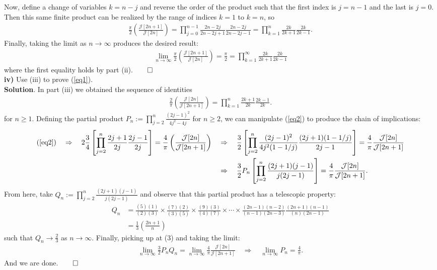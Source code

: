 \documentclass[10pt]{article}
\newcommand{\1}[1]{\mathbbm{1}_{#1}}
\newcommand{\mc}[1]{\mathcal{#1}}
\begin{document}
    Now, define a change of variables $k=n-j$ and reverse the order of the product such that the first index is $j=n-1$ and the last is $j=0$. Then this same finite product can be realized by
    the range of indices $k=1$ to $k=n$, so
    \begin{align*}
        \frac{\pi}{2}\left(\frac{\mc{J}[2n+1]}{\mc{J}[2n]}\right)=\prod_{j=0}^{n-1}\frac{2n-2j}{2n-2j+1}\frac{2n-2j}{2n-2j-1}=\prod_{k=1}^n\frac{2k}{2k+1}\frac{2k}{2k-1}.
    \end{align*}
    Finally, taking the limit as $n\rightarrow\infty$ produces the desired result:
    \begin{align*}
        \lim_{n\rightarrow\infty}\frac{\pi}{2}\left(\frac{\mc{J}[2n+1]}{\mc{J}[2n]}\right)=\frac{\pi}{2}=\prod_{k=1}^\infty\frac{2k}{2k+1}\frac{2k}{2k-1}
    \end{align*}
    where the first equality holds by part (ii).\hfill{$\qed$}\\[5pt]
    {\bf iv)} Use (iii) to prove (\ref{eq1}).\\[5pt]
    {\bf Solution}. In part (iii) we obtained the sequence of identities
    \begin{align}
        \frac{2}{\pi}\left(\frac{\mc{J}[2n]}{\mc{J}[2n+1]}\right)=\prod_{k=1}^n\frac{2k+1}{2k}\frac{2k-1}{2k}.\label{eq2}
    \end{align} 
    for $n\geq 1$. Defining the partial product $P_n:=\prod_{j=2}^n\tfrac{(2j-1)^2}{4j^2-4j}$ for $n\geq 2$, we can manipulate (\ref{eq2}) to produce the chain of
    implications:
    \begin{align}
        (\ref{eq2})\quad\Rightarrow\quad 2\frac{3}{4}\left[\prod_{j=2}^n\frac{2j+1}{2j}\frac{2j-1}{2j}\right]=\frac{4}{\pi}\left(\frac{\mc{J}[2n]}{\mc{J}[2n+1]}\right)\quad&\Rightarrow\quad\frac{3}{2}\left[\prod_{j=2}^n\frac{(2j-1)^2}{4j^2(1-1/j)}\frac{(2j+1)(1-1/j)}{2j-1}\right]=\frac{4}{\pi}\frac{\mc{J}[2n]}{\mc{J}[2n+1]}\\
        &\Rightarrow\quad\frac{3}{2}P_n\left[\prod_{j=2}^n\frac{(2j+1)(j-1)}{j(2j-1)}\right]=\frac{4}{\pi}\frac{\mc{J}[2n]}{\mc{J}[2n+1]}.\label{eq3}
    \end{align}
    From here, take $Q_n:=\prod_{j=2}^n\tfrac{(2j+1)(j-1)}{j(2j-1)}$ and observe that this partial product has a telescopic property:
    \begin{align*}
        Q_n&=\frac{(5)(1)}{(2)(3)}\times\frac{(7)(2)}{(3)(5)}\times\frac{(9)(3)}{(4)(7)}\times\cdots\times\frac{(2n-1)(n-2)}{(n-1)(2n-3)}\frac{(2n+1)(n-1)}{(n)(2n-1)}\\
        &=\frac{1}{3}\left(\frac{2n+1}{n}\right)
    \end{align*}
    such that $Q_n\rightarrow\tfrac{2}{3}$ as $n\rightarrow\infty$. Finally, picking up at (3) and taking the limit:
    \begin{align*}
        \lim_{n\rightarrow\infty}\frac{3}{2}P_nQ_n=\lim_{n\rightarrow\infty}\frac{4}{\pi}\frac{\mc{J}[2n]}{\mc{J}[2n+1]}\quad\Rightarrow\quad \lim_{n\rightarrow\infty}P_n=\frac{4}{\pi}.
    \end{align*}
    And we are done.\hfill{$\qed$}
\end{document}

